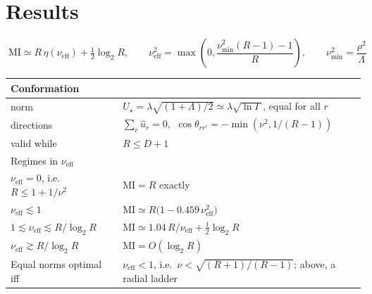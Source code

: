 \documentclass[11pt,a4paper]{article}
\newcommand{\uhat}{\hat{u}}
\newcommand{\nueff}{\nu_{\mathrm{eff}}}
\begin{document}
\section{Results}

\begin{equation}
  \boxed{\;
  \mathrm{MI}\simeq R\,\eta(\nueff)+\tfrac12\log_2R,
  \qquad
  \nueff^2=\max\!\left(0,\frac{\nu_{\min}^2(R-1)-1}{R}\right),
  \qquad
  \nu_{\min}^2=\frac{\rho^2}{\Lambda} \;}
\end{equation}

\begin{center}
\begin{tabular}{ll}
\toprule
Conformation & \\
\midrule
norm & $U_\star=\lambda\sqrt{(1+\Lambda)/2}\simeq\lambda\sqrt{\ln\Gamma}$, equal for all $r$ \\
directions & $\sum_r\uhat_r=0$, $\ \cos\theta_{rr'}=-\min(\nu^2,1/(R-1))$ \\
valid while & $R\le D+1$ \\
\midrule
Regimes in $\nueff$ & \\
\midrule
$\nueff=0$, i.e.\ $R\le1+1/\nu^2$ & $\mathrm{MI}=R$ exactly \\
$\nueff\lesssim1$ & $\mathrm{MI}\simeq R\big(1-0.459\,\nueff^2\big)$ \\
$1\lesssim\nueff\lesssim R/\log_2R$ & $\mathrm{MI}\simeq 1.04\,R/\nueff+\tfrac12\log_2R$ \\
$\nueff\gtrsim R/\log_2R$ & $\mathrm{MI}=O(\log_2R)$ \\
\midrule
Equal norms optimal iff & $\nueff<1$, i.e.\ $\nu<\sqrt{(R+1)/(R-1)}$; above, a radial ladder \\
\bottomrule
\end{tabular}
\end{center}
\end{document}
